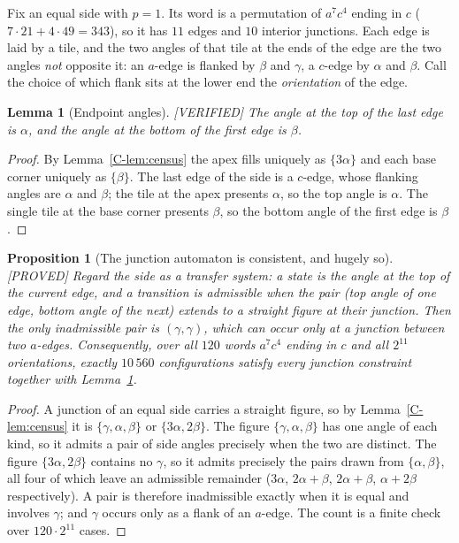 \documentclass[11pt,reqno]{amsart}
\theoremstyle{plain}
\newtheorem{lemma}[theorem]{Lemma}
\newtheorem{proposition}[theorem]{Proposition}
\theoremstyle{definition}
\newcommand{\lab}[1]{\hfill\textnormal{\footnotesize\textsc{[#1]}}}
\begin{document}
Fix an equal side with $p=1$. Its word is a permutation of $a^{7}c^{4}$ ending in $c$
($7\cdot21+4\cdot49=343$), so it has $11$ edges and $10$ interior junctions. Each edge is laid by a
tile, and the two angles of that tile at the ends of the edge are the two angles \emph{not} opposite
it: an $a$-edge is flanked by $\beta$ and $\gamma$, a $c$-edge by $\alpha$ and $\beta$. Call the
choice of which flank sits at the lower end the \emph{orientation} of the edge.

\begin{lemma}[Endpoint angles]\label{lem:endpoints}\lab{VERIFIED}
The angle at the top of the last edge is $\alpha$, and the angle at the bottom of the first edge is
$\beta$.
\end{lemma}

\begin{proof}
By Lemma~\ref{C-lem:census} the apex fills uniquely as $\{3\alpha\}$ and each base corner uniquely as
$\{\beta\}$. The last edge of the side is a $c$-edge, whose flanking angles are $\alpha$ and $\beta$;
the tile at the apex presents $\alpha$, so the top angle is $\alpha$. The single tile at the base
corner presents $\beta$, so the bottom angle of the first edge is $\beta$.
\end{proof}

\begin{proposition}[The junction automaton is consistent, and hugely so]\label{prop:nogoauto}\lab{PROVED}
Regard the side as a transfer system: a state is the angle at the top of the current edge, and a
transition is admissible when the pair (top angle of one edge, bottom angle of the next) extends to a
straight figure at their junction. Then the only inadmissible pair is $(\gamma,\gamma)$, which can
occur only at a junction between two $a$-edges. Consequently, over all $120$ words $a^{7}c^{4}$
ending in $c$ and all $2^{11}$ orientations, exactly $10\,560$ configurations satisfy every junction
constraint together with Lemma~\ref{lem:endpoints}.
\end{proposition}

\begin{proof}
A junction of an equal side carries a straight figure, so by Lemma~\ref{C-lem:census} it is
$\{\gamma,\alpha,\beta\}$ or $\{3\alpha,2\beta\}$. The figure $\{\gamma,\alpha,\beta\}$ has one angle
of each kind, so it admits a pair of side angles precisely when the two are distinct. The figure
$\{3\alpha,2\beta\}$ contains no $\gamma$, so it admits precisely the pairs drawn from
$\{\alpha,\beta\}$, all four of which leave an admissible remainder ($3\alpha$, $2\alpha+\beta$,
$2\alpha+\beta$, $\alpha+2\beta$ respectively). A pair is therefore inadmissible exactly when it is
equal and involves $\gamma$; and $\gamma$ occurs only as a flank of an $a$-edge. The count is a
finite check over $120\cdot2^{11}$ cases.
\end{proof}
\end{document}
